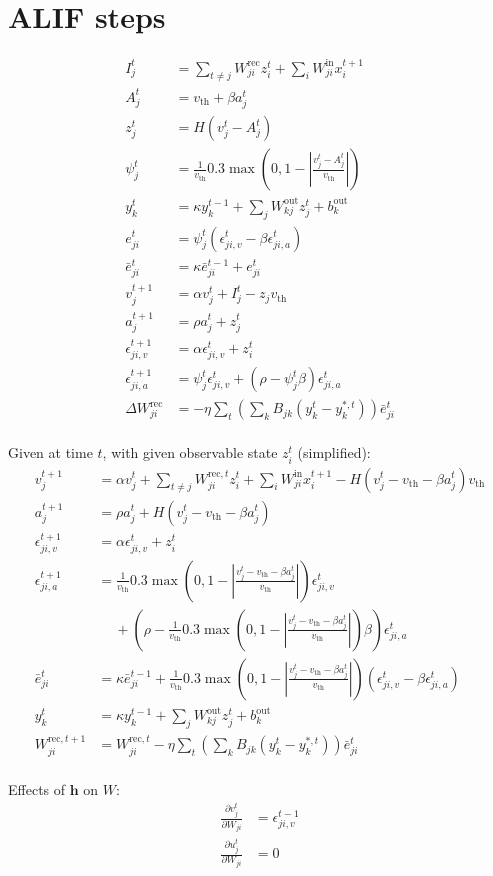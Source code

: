 \documentclass{article}
\begin{document}
\section{ALIF steps}
\begin{align}
I^t_j &= \sum_{t\neq j} W^\text{rec}_{ji} z_i^t + \sum_i W^\text{in}_{ji}x_i^{t+1} \\
A^t_j &= v_\text{th}+\beta a^t_j\\
z^t_j &= H\left(v_j^t-A_j^t\right)\\
\psi^t_j &= \frac{1}{v_\text{th}}0.3\max\left(0, 1-\left|\frac{v_j^t-A^t_j}{v_\text{th}}\right|\right)\\
y^t_k &= \kappa y^{t-1}_k + \sum_j W^\text{out}_{kj}z^t_j+b^\text{out}_k\\
e^t_{ji} &= \psi^t_j\left(\epsilon^t_{ji,v} - \beta\epsilon^t_{ji,a}\right)\\
\bar{e}^t_{ji} &= \kappa\bar{e}^{t-1}_{ji} + e^t_{ji}\\
v^{t+1}_j &= \alpha v_j^t + I_j^t-z_jv_\text{th}\\
a^{t+1}_j &= \rho a_j^t + z_j^t\\
\epsilon_{ji,v}^{t+1} &= \alpha\epsilon_{ji,v}^t + z_i^t\\
\epsilon_{ji,a}^{t+1} &= \psi^t_j\epsilon^t_{ji,v} + \left(\rho-\psi^t_j\beta\right)\epsilon^t_{ji,a}\\
\Delta W^\text{rec}_{ji} &= -\eta\sum_t\left(\sum_kB_{jk}\left(y_k^t-y_k^{*,t}\right)\right)\bar{e}^t_{ji}\\
\end{align}

Given at time $t$, with given observable state $z_i^t$ (simplified):
\begin{align}
v^{t+1}_j &= \alpha v_j^t + \sum_{t\neq j} W^{\text{rec}, t}_{ji} z_i^t + \sum_i W^\text{in}_{ji}x_i^{t+1} - H\left(v_j^t-v_\text{th}-\beta a^t_j\right)v_\text{th}\\
a^{t+1}_j &= \rho a_j^t + H\left(v_j^t-v_\text{th}-\beta a^t_j\right)\\
\epsilon_{ji,v}^{t+1} &= \alpha\epsilon_{ji,v}^t + z_i^t\\
\epsilon_{ji,a}^{t+1} &= \frac{1}{v_\text{th}}0.3\max\left(0, 1-\left|\frac{v_j^t-v_\text{th}-\beta a^t_j}{v_\text{th}}\right|\right)\epsilon^t_{ji,v} \\ &\quad \ + \left(\rho-\frac{1}{v_\text{th}}0.3\max\left(0, 1-\left|\frac{v_j^t-v_\text{th}-\beta a^t_j}{v_\text{th}}\right|\right)\beta\right)\epsilon^t_{ji,a}\\
\bar{e}^t_{ji} &= \kappa\bar{e}^{t-1}_{ji} + \frac{1}{v_\text{th}}0.3\max\left(0, 1-\left|\frac{v_j^t-v_\text{th}-\beta a^t_j}{v_\text{th}}\right|\right)\left(\epsilon^t_{ji,v} - \beta\epsilon^t_{ji,a}\right)\\
y^t_k &= \kappa y^{t-1}_k + \sum_j W^\text{out}_{kj}z^t_j+b^\text{out}_k\\
W^{\text{rec}, t+1}_{ji} &= W^{\text{rec}, t}_{ji} -\eta\sum_t\left(\sum_kB_{jk}\left(y_k^t-y_k^{*,t}\right)\right)\bar{e}^t_{ji}\\
\end{align}



Effects of $\mathbf{h}$ on $W$:
\begin{align}
\frac{\partial v_j^t}{\partial W_{ji}} &= \epsilon_{ji,v}^{t-1} \\
\frac{\partial u_j^t}{\partial W_{ji}} &= 0
\end{align}
\end{document}
